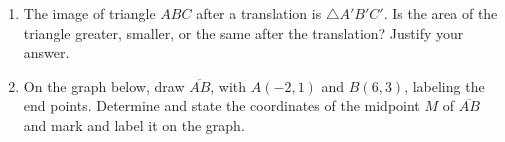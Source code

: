 \documentclass[12pt, twoside]{article}
\begin{document}
\begin{enumerate}
  \item The image of triangle $ABC$ after a translation is $\triangle A'B'C'$. Is the area of the triangle greater, smaller, or the same after the translation? Justify your answer. \vspace{3cm}

  \item On the graph below, draw $\overline{AB}$, with $A(-2,1)$ and $B(6,3)$, labeling the end points. Determine and state the coordinates of the midpoint $M$ of $\overline{AB}$ and mark and label it on the graph.\\

\end{enumerate}
\end{document}
